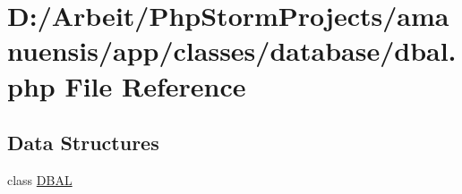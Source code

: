 \hypertarget{a00088}{}\section{D\+:/\+Arbeit/\+Php\+Storm\+Projects/amanuensis/app/classes/database/dbal.php File Reference}
\label{a00088}
\subsection*{Data Structures}
\begin{DoxyCompactItemize}
\item 
class \hyperlink{a00022}{D\+B\+A\+L}
\end{DoxyCompactItemize}
